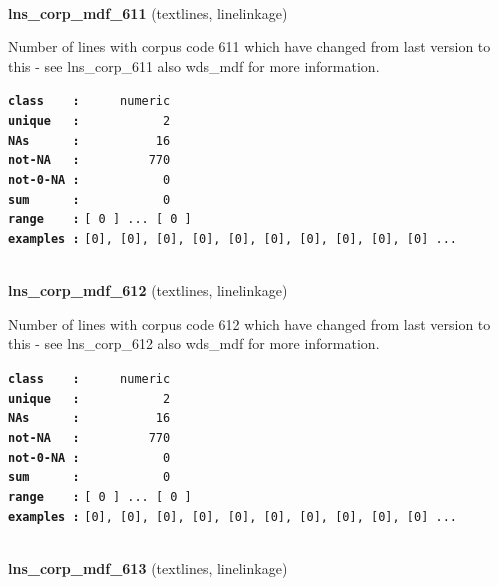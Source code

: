 \documentclass[]{article}
\begin{document}
~

\textbf{lns\_corp\_mdf\_611} (textlines, linelinkage)

Number of lines with corpus code 611 which have changed from last
version to this - see lns\_corp\_611 also wds\_mdf for more information.

\textbf{\texttt{class\ \ \ \ :}} \texttt{~~~~~numeric}\\
\textbf{\texttt{unique\ \ \ :}} \texttt{~~~~~~~~~~~2}\\
\textbf{\texttt{NAs\ \ \ \ \ \ :}} \texttt{~~~~~~~~~~16}\\
\textbf{\texttt{not-NA\ \ \ :}} \texttt{~~~~~~~~~770}\\
\textbf{\texttt{not-0-NA\ :}} \texttt{~~~~~~~~~~~0}\\
\textbf{\texttt{sum\ \ \ \ \ \ :}} \texttt{~~~~~~~~~~~0}\\
\textbf{\texttt{range\ \ \ \ :}}
\texttt{{[}\ 0\ {]}\ ...\ {[}\ 0\ {]}}\\
\textbf{\texttt{examples\ :}}
\texttt{{[}0{]},\ {[}0{]},\ {[}0{]},\ {[}0{]},\ {[}0{]},\ {[}0{]},\ {[}0{]},\ {[}0{]},\ {[}0{]},\ {[}0{]}\ ...}\\

~

\textbf{lns\_corp\_mdf\_612} (textlines, linelinkage)

Number of lines with corpus code 612 which have changed from last
version to this - see lns\_corp\_612 also wds\_mdf for more information.

\textbf{\texttt{class\ \ \ \ :}} \texttt{~~~~~numeric}\\
\textbf{\texttt{unique\ \ \ :}} \texttt{~~~~~~~~~~~2}\\
\textbf{\texttt{NAs\ \ \ \ \ \ :}} \texttt{~~~~~~~~~~16}\\
\textbf{\texttt{not-NA\ \ \ :}} \texttt{~~~~~~~~~770}\\
\textbf{\texttt{not-0-NA\ :}} \texttt{~~~~~~~~~~~0}\\
\textbf{\texttt{sum\ \ \ \ \ \ :}} \texttt{~~~~~~~~~~~0}\\
\textbf{\texttt{range\ \ \ \ :}}
\texttt{{[}\ 0\ {]}\ ...\ {[}\ 0\ {]}}\\
\textbf{\texttt{examples\ :}}
\texttt{{[}0{]},\ {[}0{]},\ {[}0{]},\ {[}0{]},\ {[}0{]},\ {[}0{]},\ {[}0{]},\ {[}0{]},\ {[}0{]},\ {[}0{]}\ ...}\\

~

\textbf{lns\_corp\_mdf\_613} (textlines, linelinkage)
\end{document}
